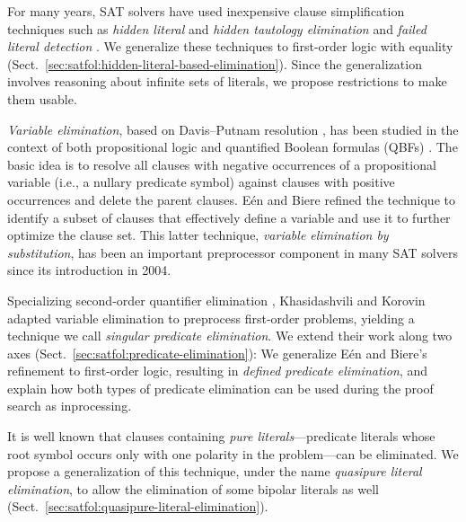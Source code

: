 For many years, SAT solvers have used inexpensive clause simplification
techniques such as \emph{hidden literal} and \emph{hidden tautology elimination}
\cite{hjb-2010-cl-elim,hjb-2011-big-simplification} and \emph{failed literal
detection} \cite[Sect.~1.6]{jwf-1995-fld}. We generalize these techniques to
first-order logic with equality
(Sect.~\ref{sec:satfol:hidden-literal-based-elimination}). Since the generalization
involves reasoning about infinite sets of literals, we propose restrictions to
make them usable.

\emph{Variable elimination}, based on Davis--Putnam resolution \cite{dp-60-dp}, has
been studied in the context of both propositional logic
\cite{sp-04-niver,cs-00-zres} and quantified Boolean formulas (QBFs)
\cite{ab-2004-re}. The basic idea is to resolve all clauses with negative
occurrences of a propositional variable (i.e., a nullary predicate symbol) against
clauses with positive occurrences and delete the parent clauses. E\'en and
Biere \cite{eb-2005-satpreprocess} refined the technique to identify a subset
of clauses that effectively define a variable and use it to further optimize the
clause set. This latter technique, \emph{variable elimination by substitution},
has been an important preprocessor component in many SAT solvers since its
introduction in 2004.

\begin{sloppypar}
    Specializing second-order quantifier elimination
    \cite{go-1992-so-pred-elim,hjo-1996-scan}, Khasidashvili and Korovin~\cite{kk-2016-pe-fol} adapted variable elimination to preprocess first-order
    problems, yielding a technique we call \emph{singular predicate elimination}. We
    extend their work along two axes (Sect.~\ref{sec:satfol:predicate-elimination}): We
    generalize E\'en and Biere's refinement to first-order logic, resulting in
    \emph{defined predicate elimination}, and explain how both types of predicate
    elimination can be used during the proof search as inprocessing.    
\end{sloppypar}

\begin{qle}
It is well known that clauses containing \emph{pure literals}---predicate
literals whose root symbol occurs only with one polarity in the problem---can
be eliminated. We propose a generalization of this technique, under the name
\emph{quasipure literal elimination}, to allow the elimination of some bipolar
literals as well (Sect.~\ref{sec:satfol:quasipure-literal-elimination}).
\end{qle}

